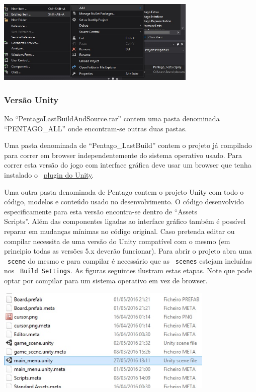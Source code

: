 \begin{table}[H]
\centering
\includegraphics[height=4cm]{user_manual/includestuff2.jpg}
\end{table}

\newpage
\subsubsection{Vers\~ao Unity}

No ``PentagoLastBuildAndSource.rar'' contem uma pasta denominada ``PENTAGO\_ALL'' onde encontram-se outras duas pastas. 

Uma pasta denominada de ``Pentago\_LastBuild'' contem o projeto já compilado para correr em browser independentemente do sistema operativo usado. Para correr esta versão do jogo com interface gráfica deve usar um browser que tenha instalado o ~\href{https://unity3d.com/pt/webplayer}{plugin do Unity}. 

Uma outra pasta denominada de Pentago contem o projeto Unity com todo o código, modelos e conteúdo usado no desenvolvimento. O código desenvolvido especificamente para esta versão encontra-se dentro de ``Assets\\Scripts''. Além das componentes ligadas ao interface gráfico também é possível reparar em mudanças mínimas no código original. Caso pretenda editar ou compilar necessita de uma vers\~ao do Unity compatível com o mesmo (em principio todas as versões 5.x deverão funcionar). Para abrir o projeto abra uma ~\verb|scene| do mesmo e para compilar é necessário que as ~\verb|scenes| estejam incluídas nos ~\verb|Build Settings|. As figuras seguintes ilustram estas etapas. Note que pode optar por compilar para um sistema operativo em vez de browser.

\begin{table}[H]
\centering
\includegraphics[height=5cm]{user_manual/unityscene.jpg}
\end{table}

